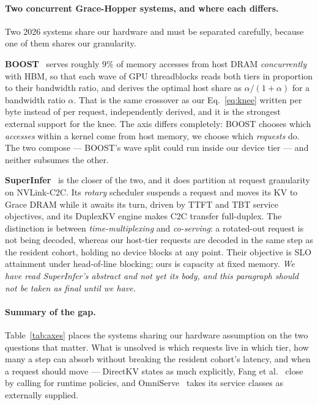 \paragraph{Two concurrent Grace-Hopper systems, and where each differs.}
Two 2026 systems share our hardware and must be separated carefully, because one
of them shares our granularity.

\textbf{BOOST}~\cite{boost} serves roughly $9\%$ of memory accesses from host DRAM
\emph{concurrently} with HBM, so that each wave of GPU threadblocks reads both tiers
in proportion to their bandwidth ratio, and derives the optimal host share as
$\alpha/(1{+}\alpha)$ for a bandwidth ratio $\alpha$. That is the same crossover as
our Eq.~\ref{eq:knee} written per byte instead of per request, independently
derived, and it is the strongest external support for the knee. The axis differs
completely: BOOST chooses which \emph{accesses} within a kernel come from host
memory, we choose which \emph{requests} do. The two compose --- BOOST's wave split
could run inside our device tier --- and neither subsumes the other.

\textbf{SuperInfer}~\cite{superinfer} is the closer of the two, and it does
partition at request granularity on NVLink-C2C. Its \emph{rotary} scheduler
suspends a request and moves its KV to Grace DRAM while it awaits its turn, driven
by TTFT and TBT service objectives, and its DuplexKV engine makes C2C transfer
full-duplex. The distinction is between \emph{time-multiplexing} and
\emph{co-serving}: a rotated-out request is not being decoded, whereas our
host-tier requests are decoded in the same step as the resident cohort, holding no
device blocks at any point. Their objective is SLO attainment under head-of-line
blocking; ours is capacity at fixed memory. \emph{We have read SuperInfer's
abstract and not yet its body, and this paragraph should not be taken as final
until we have.}

\paragraph{Summary of the gap.} Table~\ref{tab:axes} places the systems sharing our
hardware assumption on the two questions that matter. What is unsolved is which
requests live in which tier, how many a step can absorb without breaking the resident
cohort's latency, and when a request should move --- DirectKV states as much
explicitly, Fang et al.~\cite{calkv} close by calling for runtime policies, and
OmniServe~\cite{omniserve} takes its service classes as externally supplied.

